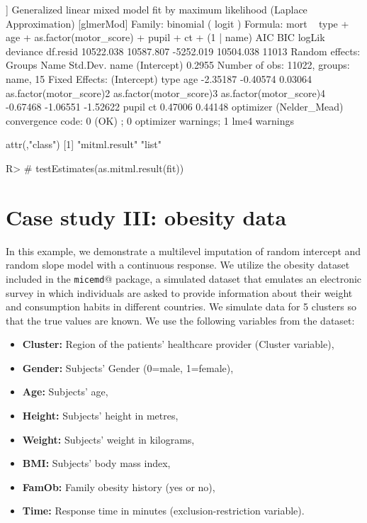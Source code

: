\documentclass[
]{jss}
\providecommand{\tightlist}{%
  \setlength{\itemsep}{0pt}\setlength{\parskip}{0pt}}
\begin{document}
\begin{CodeChunk}
\begin{CodeOutput}
[[5]]
Generalized linear mixed model fit by maximum likelihood (Laplace
  Approximation) [glmerMod]
 Family: binomial  ( logit )
Formula: mort ~ type + age + as.factor(motor_score) + pupil + ct + (1 |  
    name)
      AIC       BIC    logLik  deviance  df.resid 
10522.038 10587.807 -5252.019 10504.038     11013 
Random effects:
 Groups Name        Std.Dev.
 name   (Intercept) 0.2955  
Number of obs: 11022, groups:  name, 15
Fixed Effects:
            (Intercept)                     type                      age  
               -2.35187                 -0.40574                  0.03064  
as.factor(motor_score)2  as.factor(motor_score)3  as.factor(motor_score)4  
               -0.67468                 -1.06551                 -1.52622  
                  pupil                       ct  
                0.47006                  0.44148  
optimizer (Nelder_Mead) convergence code: 0 (OK) ; 0 optimizer warnings; 1 lme4 warnings 

attr(,"class")
[1] "mitml.result" "list"        
\end{CodeOutput}
\begin{CodeInput}
R> # testEstimates(as.mitml.result(fit))
\end{CodeInput}
\end{CodeChunk}

\hypertarget{case-study-iii-obesity-data}{%
\section{Case study III: obesity
data}\label{case-study-iii-obesity-data}}

In this example, we demonstrate a multilevel imputation of random
intercept and random slope model with a continuous response. We utilize
the obesity dataset included in the \texttt{micemd}@ package, a
simulated dataset that emulates an electronic survey in which
individuals are asked to provide information about their weight and
consumption habits in different countries. We simulate data for 5
clusters so that the true values are known. We use the following
variables from the dataset:

\begin{itemize}
\tightlist
\item
  \textbf{Cluster:} Region of the patients' healthcare provider (Cluster
  variable),
\item
  \textbf{Gender:} Subjects' Gender (0=male, 1=female),
\item
  \textbf{Age:} Subjects' age,
\item
  \textbf{Height:} Subjects' height in metres,
\item
  \textbf{Weight:} Subjects' weight in kilograms,
\item
  \textbf{BMI:} Subjects' body mass index,
\item
  \textbf{FamOb:} Family obesity history (yes or no),
\item
  \textbf{Time:} Response time in minutes (exclusion-restriction
  variable).
\end{itemize}
\end{document}

